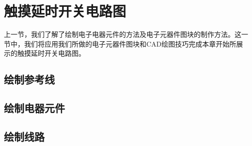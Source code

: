 \section{触摸延时开关电路图}
上一节，我们了解了绘制电子电器元件的方法及电子元器件图块的制作方法。这一节中，我们将应用我们所做的电子元器件图块和CAD绘图技巧完成本章开始所展示的触摸延时开关电路图。
\subsection{绘制参考线}
\subsection{绘制电器元件}
\subsection{绘制线路}

\endinput